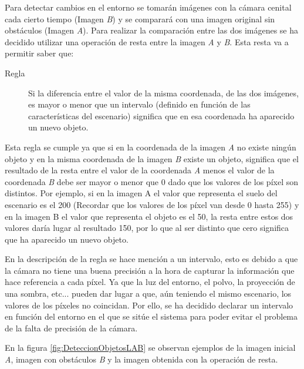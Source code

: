 Para detectar cambios en el entorno se tomarán imágenes con la cámara cenital cada cierto tiempo (Imagen \emph{B}) y se comparará con una imagen original sin obstáculos (Imagen \emph{A}).
Para realizar la comparación entre las dos imágenes se ha decidido utilizar una operación de resta entre la imagen \emph{A} y \emph{B}. Esta resta va a permitir saber que: 

\begin{description}
\item [Regla] Si la diferencia entre el valor de la misma coordenada, de las dos imágenes, es mayor o menor que un intervalo (definido en función de las características del escenario) significa que en esa coordenada ha aparecido un nuevo objeto. 
\end{description}

Esta regla se cumple ya que si en la coordenada de la imagen \emph{A} no existe ningún objeto y en la misma coordenada de la imagen \emph{B} existe un objeto, significa que el resultado de la resta entre el valor de la coordenada \emph{A} menos el valor de la coordenada \emph{B} debe ser mayor o menor que 0 dado que los valores de los píxel son distintos. Por ejemplo, si en la imagen A el valor que representa el suelo del escenario es el 200 (Recordar que los valores de los píxel van desde 0 hasta 255) y en la imagen B el valor que representa el objeto es el 50, la resta entre estos dos valores daría lugar al resultado 150, por lo que al ser distinto que cero significa que ha aparecido un nuevo objeto.

En la descripción de la regla se hace mención a un intervalo, esto es debido a que la cámara no tiene una buena precisión a la hora de capturar la información que hace referencia a cada píxel. Ya que la luz del entorno, el polvo, la proyección de una sombra, etc... pueden dar lugar a que, aún teniendo el mismo escenario, los valores de los píxeles no coincidan. Por ello, se ha decidido declarar un intervalo en función del entorno en el que se sitúe el sistema para poder evitar el problema de la falta de precisión de la cámara.

En la figura \ref{fig:DeteccionObjetosLAB} se observan ejemplos de la imagen inicial \emph{A}, imagen con obstáculos \emph{B} y la imagen obtenida con la operación de resta.

